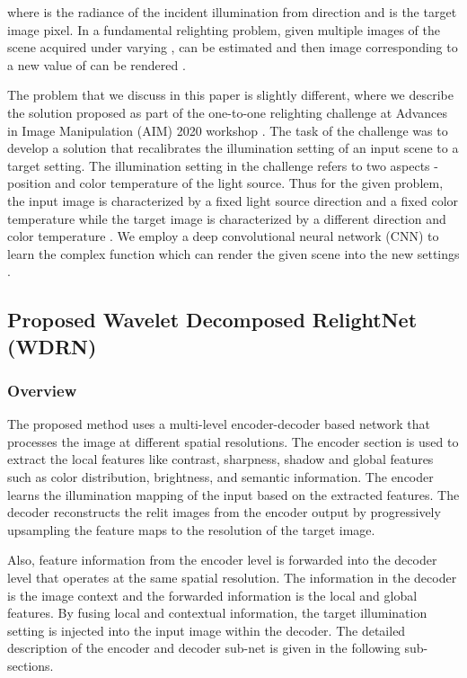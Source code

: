 \documentclass[runningheads]{llncs}
\begin{document}
where  is the radiance of the incident illumination from direction  and  is the target image pixel. In a fundamental relighting problem, given multiple images of the scene acquired under varying ,  can be estimated and then image corresponding to a new value of   can be rendered \cite{relightnet_a}.
\par 
The problem that we discuss in this paper is slightly different, where we describe the solution proposed as part of the one-to-one relighting challenge at Advances in Image Manipulation (AIM) 2020 workshop \cite{elhelou2020aim}. The task of the challenge was to develop a solution that recalibrates the illumination setting of an input scene to a target setting. The illumination setting in the challenge refers to two aspects - position and color temperature of the light source. Thus for the given problem, the input image is characterized by a fixed light source direction  and a fixed color temperature  while the target image is characterized by a different direction  and color temperature . We employ a deep convolutional neural network (CNN) to learn the complex function  which can render the given scene into the new settings .


\subsection{Proposed Wavelet Decomposed RelightNet (WDRN)}
\subsubsection{Overview}
\par The proposed method uses a multi-level encoder-decoder based network that processes the image at different spatial resolutions. The encoder section is used to extract the local features like contrast, sharpness, shadow and global features such as color distribution, brightness, and semantic information. The encoder learns the illumination mapping of the input based on the extracted features. The decoder reconstructs the relit images from the encoder output by progressively upsampling the feature maps to the resolution of the target image.

\par
Also, feature information from the encoder level is forwarded into the decoder level that operates at the same spatial resolution. The information in the decoder is the image context and the forwarded information is the local and global features. By fusing local  and contextual information, the target illumination setting is injected into the input image within the decoder. The detailed description of the encoder and decoder sub-net is given in the following sub-sections.
\end{document}
